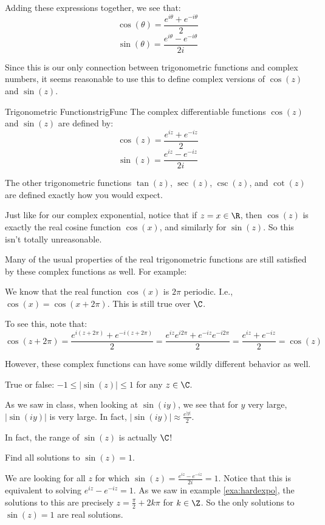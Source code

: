 Adding these expressions together, we see that:
$$\cos(\theta) = \frac{e^{i\theta} + e^{-i\theta}}{2}$$
$$\sin(\theta) = \frac{e^{i\theta} - e^{-i\theta}}{2i}$$

Since this is our only connection between trigonometric functions and complex numbers, it seems reasonable to use this to define complex versions of $\cos(z)$ and $\sin(z)$.

\begin{defbo}{Trigonometric Functions}{trigFunc} The complex differentiable functions $\cos(z)$ and $\sin(z)$ are defined by:
$$\cos(z) = \frac{e^{iz} + e^{-iz}}{2}$$
$$\sin(z) = \frac{e^{iz} - e^{-iz}}{2i}$$

The other trigonometric functions $\tan(z)$, $\sec(z)$, $\csc(z)$, and $\cot(z)$ are defined exactly how you would expect.
\end{defbo}

Just like for our complex exponential, notice that if $z = x\in \R$, then $\cos(z)$ is exactly the real cosine function $\cos(x)$, and similarly for $\sin(z)$. So this isn't totally unreasonable.


Many of the usual properties of the real trigonometric functions are still satisfied by these complex functions as well. For example:

\begin{ex}{}{} We know that the real function $\cos(x)$ is $2\pi$ periodic. I.e., $\cos(x) = \cos(x + 2\pi)$. This is still true over $\C$.

To see this, note that:
$$\cos(z + 2\pi) = \frac{e^{i(z + 2\pi)} + e^{-i(z + 2\pi)}}{2} = \frac{e^{iz}e^{i2\pi} + e^{-iz}e^{-i2\pi}}{2} = \frac{e^{iz} + e^{-iz}}{2} = \cos(z)$$
\end{ex}

However, these complex functions can have some wildly different behavior as well.

\begin{ex}{}{} True or false: $-1 \le |\sin(z)| \le 1$ for any $z\in \C$.

As we saw in class, when looking at $\sin(iy)$, we see that for $y$ very large, $|\sin(iy)|$ is very large. In fact, $|\sin(iy)| \approx \frac{e^{|y|}}{2}$.

In fact, the range of $\sin(z)$ is actually $\C$!

\end{ex}

\begin{ex}{}{} Find all solutions to $\sin(z) = 1$.

We are looking for all $z$ for which $\sin(z) = \frac{e^{iz} - e^{-iz}}{2i} = 1$. Notice that this is equivalent to solving $e^{iz} - e^{-iz} = 1$. As we saw in example \ref{exa:hardexpo}, the solutions to this are precisely $z = \frac{\pi}{2} + 2k\pi$ for $k\in \Z$. So the only solutions to $\sin(z) = 1$ are real solutions.

\end{ex}





